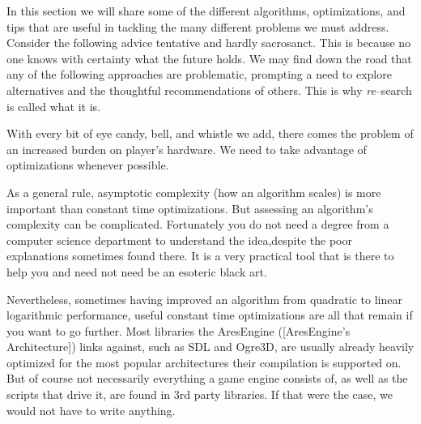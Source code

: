 
    {}

In this section we will share some of the different algorithms, optimizations, and tips that are useful in tackling the many different problems we must address. Consider the following advice tentative and hardly sacrosanct. This is because no one knows with certainty what the future holds. We may find down the road that any of the following approaches are problematic, prompting a need to explore alternatives and the thoughtful recommendations of others. This is why {\it re}--search is called what it is.

With every bit of eye candy, bell, and whistle we add, there comes the problem of an increased burden on player's hardware. We need to take advantage of optimizations whenever possible. 

As a general rule, asymptotic complexity (how an algorithm scales) is more important than constant time optimizations. But assessing an algorithm's complexity can be complicated. Fortunately you do not need a degree from a computer science department to understand the idea, despite the poor explanations sometimes found there. It is a very practical tool that is there to help you and need not need be an esoteric black art.

Nevertheless, sometimes having improved an algorithm from quadratic to linear logarithmic performance, useful constant time optimizations are all that remain if you want to go further. Most libraries the AresEngine ([AresEngine's Architecture]) links against, such as SDL and Ogre3D, are usually already heavily optimized for the most popular architectures their compilation is supported on. But of course not necessarily everything a game engine consists of, as well as the scripts that drive it, are found in 3rd party libraries. If that were the case, we would not have to write anything.


